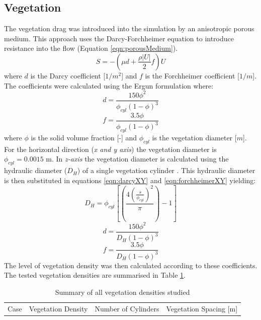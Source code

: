 \begin{refsection}
\subsection{Vegetation}
The vegetation drag was introduced into the simulation by an anisotropic porous medium. This approach uses the Darcy-Forchheimer equation to introduce resistance into the flow (Equation \ref{eqn:porousMedium}). 
\begin{equation}
S=- \left ( \mu d +\frac{\rho |U|}{2}f \right ) U
\label{eqn:porousMedium}
\end{equation}
where $d$ is the Darcy coefficient [$1/m^2$] and $f$ is the Forchheimer coefficient [$1/m$]. The coefficients were calculated using the Ergun formulation where:
\begin{equation}
d=\frac{150\phi^2}{\phi_{cyl}(1-\phi)^3}
\label{eqn:darcyXY}
\end{equation}
\begin{equation}
f=\frac{3.5\phi}{\phi_{cyl}(1-\phi)^3}
\label{eqn:forchheimerXY}
\end{equation}
where $\phi$ is the solid volume fraction [-] and  $\phi_{cyl}$ is the vegetation diameter [$m$]. For the horizontal direction (\textit{x and y axis}) the vegetation diameter is $\phi_{cyl}=0.0015$ m. In \textit{z-axis} the vegetation diameter is calculated using the hydraulic diameter ($D_H$) of a single vegetation cylinder \cite{oldham2001}. This hydraulic diameter is then substituted in equations \ref{eqn:darcyXY} and \ref{eqn:forchheimerXY} yielding:
\begin{equation}
D_H=\phi_{cyl}\left[\left(\frac{4\left(\frac{s}{\phi_{cyl}} \right )^2}{\pi} \right )-1 \right ]
\end{equation}
\begin{equation}
d=\frac{150\phi^2}{D_H(1-\phi)^3}
\label{eqn:darcyZ}
\end{equation}
\begin{equation}
f=\frac{3.5\phi}{D_H(1-\phi)^3}
\label{eqn:forchheimerZ}
\end{equation}
The level of vegetation density was then calculated according to these coefficients. The tested vegetation densities are summarised in Table \ref{tab:vegetationDensities}.
\begin{table}[!hb]
\centering
\caption{Summary of all vegetation densities studied}
\label{tab:vegetationDensities}
\begin{tabular}{lrrr}
Case & \multicolumn{1}{l}{Vegetation Density} & \multicolumn{1}{l}{Number of Cylinders} & \multicolumn{1}{l}{Vegetation Spacing {[}m{]}} \\

\end{tabular}
\end{table}
\end{refsection}
